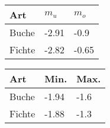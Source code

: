 \section*{}
\begin{frame}[plain]

  \begin{center}
    \begin{minipage}{0.33\linewidth}
      \begin{tabular}{l l l}
        \toprule
        Art & \(m_u\) & \(m_o\) \\
        \midrule
        Buche & -2.91 & -0.9 \\
        Fichte & -2.82 & -0.65 \\
        \bottomrule
      \end{tabular}

      \vspace{5mm}
      
      \begin{tabular}{l l l}
        \toprule
        Art & Min. & Max. \\
        \midrule
        Buche & -1.94 & -1.6 \\
        Fichte & -1.88 & -1.3 \\
        \bottomrule
      \end{tabular}
    \end{minipage}
  \end{center}

\end{frame}

